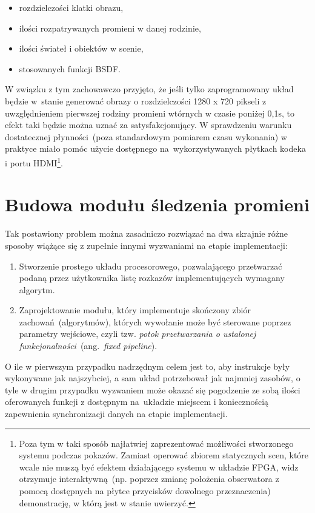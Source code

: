 \begin{enumerate}
\begin{itemize}
\item rozdzielczości klatki obrazu,
\item ilości rozpatrywanych promieni w danej rodzinie,
\item ilości świateł i obiektów w scenie,
\item stosowanych funkcji BSDF.
\end{itemize} 
W związku z tym zachowawczo przyjęto, że jeśli tylko zaprogramowany układ będzie w~stanie generować obrazy o rozdzielczości 1280 x 720 pikseli z uwzględnieniem pierwszej rodziny promieni wtórnych w czasie poniżej 0,1s, to efekt taki będzie można uznać za satysfakcjonujący. W sprawdzeniu warunku dostatecznej płynności~(poza standardowym pomiarem czasu wykonania) w praktyce miało pomóc użycie dostępnego na~wykorzystywanych płytkach kodeka i portu HDMI\footnote{Poza tym w taki sposób najłatwiej zaprezentować możliwości stworzonego systemu podczas pokazów. Zamiast operować zbiorem statycznych scen, które wcale nie muszą być efektem działającego systemu w układzie FPGA, widz otrzymuje interaktywną~(np. poprzez zmianę położenia obserwatora z pomocą dostępnych na płytce przycisków dowolnego przeznaczenia) demonstrację, w którą jest w stanie uwierzyć.}.
\end{enumerate}

\section{Budowa modułu śledzenia promieni}
Tak postawiony problem można zasadniczo rozwiązać na dwa skrajnie różne sposoby wiążące się z zupełnie innymi wyzwaniami na etapie implementacji:
\begin{enumerate}
\item Stworzenie prostego układu procesorowego, pozwalającego przetwarzać podaną przez użytkownika listę rozkazów implementujących wymagany algorytm.
\item Zaprojektowanie modułu, który implementuje skończony zbiór zachowań~(algorytmów), których wywołanie może być sterowane poprzez parametry wejściowe, czyli tzw. \textit{potok przetwarzania o ustalonej funkcjonalności}~(ang.~\textit{fixed pipeline}).
\end{enumerate}
O ile w pierwszym przypadku nadrzędnym celem jest to, aby instrukcje były wykonywane jak najszybciej, a sam układ potrzebował jak najmniej zasobów, o tyle w drugim przypadku wyzwaniem może okazać się pogodzenie ze sobą ilości oferowanych funkcji z dostępnym na~układzie miejscem i koniecznością zapewnienia synchronizacji danych na etapie implementacji.


